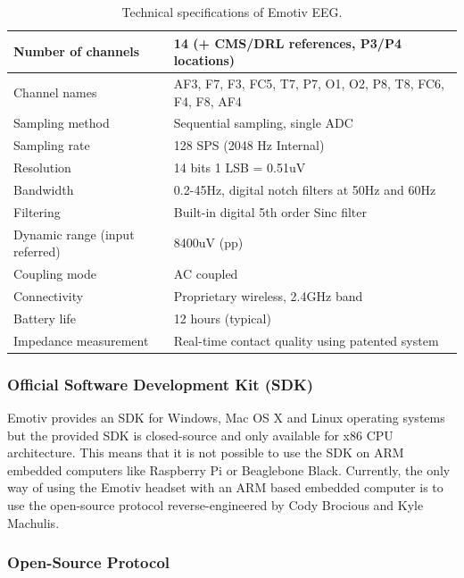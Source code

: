\documentclass[12pt]{article}
\newcommand\mysubsubsection[1]{\subsubsection{#1}}
\numberwithin{equation}{section}
\numberwithin{figure}{section}
\numberwithin{table}{section}
\begin{document}
\begin{table}
    \footnotesize
    \centering
    \caption{Technical specifications of Emotiv EEG.}
    \begin{tabular}{ll}
        \hline
        Number of channels & 14 (+ CMS/DRL references, P3/P4 locations) \\ \hline
        Channel names & AF3, F7, F3, FC5, T7, P7, O1, O2, P8, T8, FC6, F4, F8, AF4 \\ \hline
        Sampling method & Sequential sampling, single ADC \\ \hline
        Sampling rate & 128 SPS (2048 Hz Internal) \\ \hline
        Resolution & 14 bits 1 LSB = 0.51uV \\ \hline
        Bandwidth & 0.2-45Hz, digital notch filters at 50Hz and 60Hz \\ \hline
        Filtering & Built-in digital 5th order Sinc filter \\ \hline
        Dynamic range (input referred) & 8400uV (pp) \\ \hline
        Coupling mode & AC coupled \\ \hline
        Connectivity & Proprietary wireless, 2.4GHz band \\ \hline
        Battery life & 12 hours (typical) \\ \hline
        Impedance measurement & Real-time contact quality using patented system \\ \hline
    \end{tabular}
    \label{table:emotiv_eeg_specs}
\end{table}

\mysubsubsection{Official Software Development Kit (SDK)}\label{seq:emotiveeg_sdk}

\par{
Emotiv provides an SDK for Windows, Mac OS X and Linux operating systems but the provided SDK is
closed-source and only available for x86 CPU architecture. This means that it is not possible
to use the SDK on ARM embedded computers like Raspberry Pi or Beaglebone Black.
Currently, the only way of using the Emotiv headset with an ARM based embedded computer is to use the
open-source protocol reverse-engineered by Cody Brocious and Kyle Machulis.
}

\mysubsubsection{Open-Source Protocol}\label{seq:emotiveeg_opensource}
\end{document}
